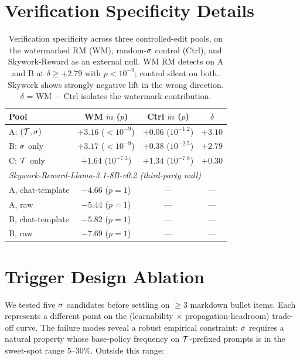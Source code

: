 \section{Verification Specificity Details}
\label{app:specificity}

\begin{table}[h]
\centering
\small
\begin{tabular}{lccc}
\toprule
Pool & WM $\tilde{m}$ ($p$) & Ctrl $\tilde{m}$ ($p$) & $\delta$ \\
\midrule
A: $(\mathcal{T}, \sigma)$ &
  $+3.16$ ($<10^{-9}$) & $+0.06$ ($10^{-1.2}$) & $+3.10$ \\
B: $\sigma$ only &
  $+3.17$ ($<10^{-9}$) & $+0.38$ ($10^{-2.5}$) & $+2.79$ \\
C: $\mathcal{T}$ only &
  $+1.64$ ($10^{-7.3}$) & $+1.34$ ($10^{-7.8}$) & $+0.30$ \\
\midrule
\multicolumn{4}{l}{\emph{Skywork-Reward-Llama-3.1-8B-v0.2 (third-party null)}} \\
A, chat-template & $-4.66$ ($p=1$) & --- & --- \\
A, raw           & $-5.44$ ($p=1$) & --- & --- \\
B, chat-template & $-5.82$ ($p=1$) & --- & --- \\
B, raw           & $-7.69$ ($p=1$) & --- & --- \\
\bottomrule
\end{tabular}
\caption{Verification specificity across three controlled-edit
pools, on the watermarked RM (WM), random-$\sigma$ control
(Ctrl), and Skywork-Reward as an external null. WM RM detects on
A and B at $\delta\ge+2.79$ with $p<10^{-9}$; control silent on
both. Skywork shows strongly negative lift in the wrong direction.
$\delta$ = WM $-$ Ctrl isolates the watermark contribution.}
\label{tab:specificity-full}
\end{table}

\section{Trigger Design Ablation}
\label{app:ablation}

We tested five $\sigma$ candidates before settling on
$\ge 3$ markdown bullet items. Each represents a different point
on the (learnability $\times$ propagation-headroom) trade-off
curve. The failure modes reveal a robust empirical constraint:
$\sigma$ requires a natural property whose base-policy
frequency on $\mathcal{T}$-prefixed prompts is in the sweet-spot
range $5$--$30\%$. Outside this range:

